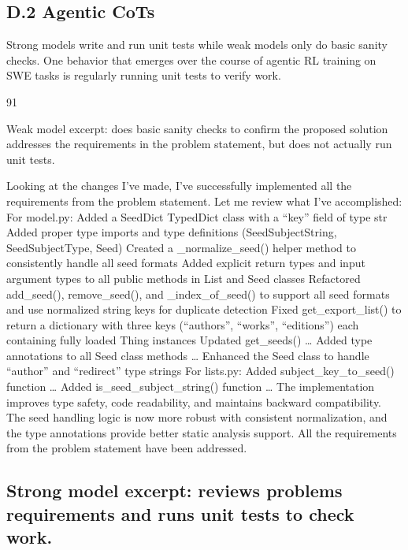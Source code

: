 \documentclass[
  10
]{article}
\begin{document}
\subsection{D.2 Agentic CoTs}\label{d.2-agentic-cots}

Strong models write and run unit tests while weak models only do basic
sanity checks. One behavior that emerges over the course of agentic RL
training on SWE tasks is regularly running unit tests to verify work.

91

Weak model excerpt: does basic sanity checks to confirm the proposed
solution addresses the requirements in the problem statement, but does
not actually run unit tests.

Looking at the changes I've made, I've successfully implemented all the
requirements from the problem statement. Let me review what I've
accomplished: For model.py: Added a SeedDict TypedDict class with a
``key'' field of type str Added proper type imports and type definitions
(SeedSubjectString, SeedSubjectType, Seed) Created a \_normalize\_seed()
helper method to consistently handle all seed formats Added explicit
return types and input argument types to all public methods in List and
Seed classes Refactored add\_seed(), remove\_seed(), and
\_index\_of\_seed() to support all seed formats and use normalized
string keys for duplicate detection Fixed get\_export\_list() to return
a dictionary with three keys (``authors'', ``works'', ``editions'') each
containing fully loaded Thing instances Updated get\_seeds() \ldots{}
Added type annotations to all Seed class methods \ldots{} Enhanced the
Seed class to handle ``author'' and ``redirect'' type strings For
lists.py: Added subject\_key\_to\_seed() function \ldots{} Added
is\_seed\_subject\_string() function \ldots{} The implementation
improves type safety, code readability, and maintains backward
compatibility. The seed handling logic is now more robust with
consistent normalization, and the type annotations provide better static
analysis support. All the requirements from the problem statement have
been addressed.

\subsection{Strong model excerpt: reviews problems requirements and runs
unit tests to check
work.}\label{strong-model-excerpt-reviews-problems-requirements-and-runs-unit-tests-to-check-work.}
\end{document}
